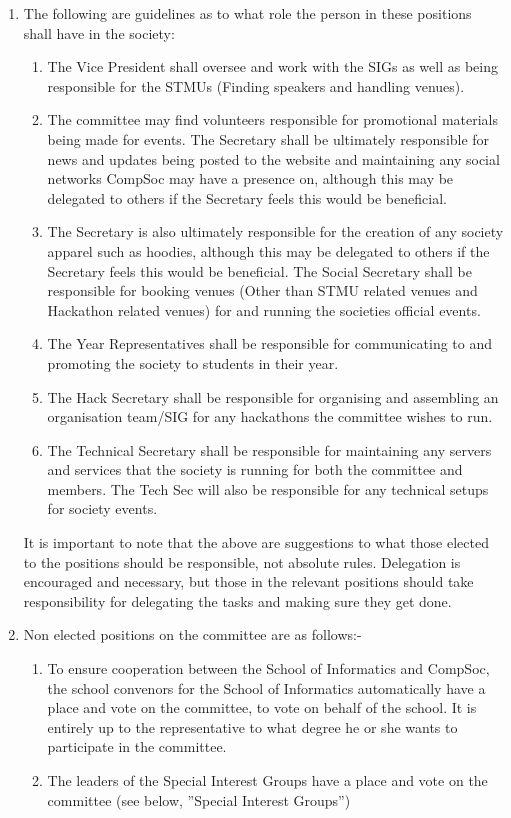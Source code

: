\documentclass{article}
\begin{document}
\begin {enumerate}
  \item The following are guidelines as to what role the person in these positions shall have in the society:
    \begin{enumerate}
      \item The Vice President shall oversee and work with the SIGs as well as
        being responsible for the STMUs (Finding speakers and handling venues).
      \item The committee may find volunteers responsible for promotional materials
        being made for events. The Secretary shall be ultimately
        responsible for news and updates being posted to the website and
        maintaining any social networks CompSoc may have a presence on,
        although this may be delegated to others if the Secretary feels this
        would be beneficial.
      \item The Secretary is also ultimately responsible for the creation of any
        society apparel such as hoodies, although this may be delegated to others
        if the Secretary feels this would be beneficial. The Social Secretary
        shall be responsible for booking venues (Other than STMU related venues 
        and Hackathon related venues) for and running the societies
        official events.
      \item The Year Representatives shall be responsible for communicating to
        and promoting the society to students in their year.
      \item The Hack Secretary shall be responsible for organising and assembling 
        an organisation team/SIG for any hackathons the committee wishes to run.
      \item The Technical Secretary shall be responsible for maintaining any servers
        and services that the society is running for both the committee and members.
        The Tech Sec will also be responsible for any technical setups for society events.
    \end{enumerate}

    It is important to note that the above are suggestions to what those elected
    to the positions should be responsible, not absolute rules. Delegation is
    encouraged and necessary, but those in the relevant positions should take
    responsibility for delegating the tasks and making sure they get done.
    
    \item Non elected positions on the committee are as follows:-
      \begin{enumerate}
        \item To ensure cooperation between the School of Informatics and CompSoc,
          the school convenors for the School of Informatics automatically
          have a place and vote on the committee, to vote on behalf of the school.
          It is entirely up to the representative to what degree he or she wants
          to participate in the committee.
        \item The leaders of the Special Interest Groups have a place and vote on
          the committee (see below, ”Special Interest Groups”)
      \end{enumerate}


\end{enumerate}
\end{document}
